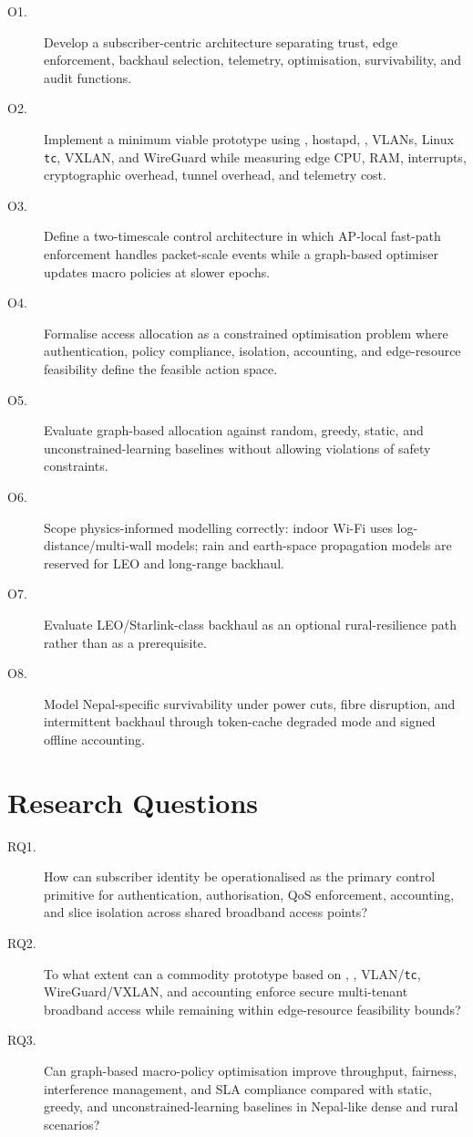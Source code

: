 \begin{description}
  \item[O1.] Develop a subscriber-centric architecture separating trust, edge enforcement, backhaul selection, telemetry, optimisation, survivability, and audit functions.
  \item[O2.] Implement a minimum viable prototype using \openWrt{}, hostapd, \freeradius{}, VLANs, Linux \texttt{tc}, VXLAN, and WireGuard while measuring edge CPU, RAM, interrupts, cryptographic overhead, tunnel overhead, and telemetry cost.
  \item[O3.] Define a two-timescale control architecture in which AP-local fast-path enforcement handles packet-scale events while a graph-based optimiser updates macro policies at slower epochs.
  \item[O4.] Formalise access allocation as a constrained optimisation problem where authentication, policy compliance, isolation, accounting, and edge-resource feasibility define the feasible action space.
  \item[O5.] Evaluate graph-based allocation against random, greedy, static, and unconstrained-learning baselines without allowing violations of safety constraints.
  \item[O6.] Scope physics-informed modelling correctly: indoor Wi-Fi uses log-distance/multi-wall models; rain and earth-space propagation models are reserved for LEO and long-range backhaul.
  \item[O7.] Evaluate LEO/Starlink-class backhaul as an optional rural-resilience path rather than as a prerequisite.
  \item[O8.] Model Nepal-specific survivability under power cuts, fibre disruption, and intermittent backhaul through token-cache degraded mode and signed offline accounting.
\end{description}

\section{Research Questions}
\label{sec:rq}

\begin{description}
  \item[RQ1.] How can subscriber identity be operationalised as the primary control primitive for authentication, authorisation, QoS enforcement, accounting, and slice isolation across shared broadband access points?
  \item[RQ2.] To what extent can a commodity prototype based on \openWrt{}, \freeradius{}, VLAN/\texttt{tc}, WireGuard/VXLAN, and \radius{} accounting enforce secure multi-tenant broadband access while remaining within edge-resource feasibility bounds?
  \item[RQ3.] Can graph-based macro-policy optimisation improve throughput, fairness, interference management, and SLA compliance compared with static, greedy, and unconstrained-learning baselines in Nepal-like dense and rural scenarios?
\end{description}

